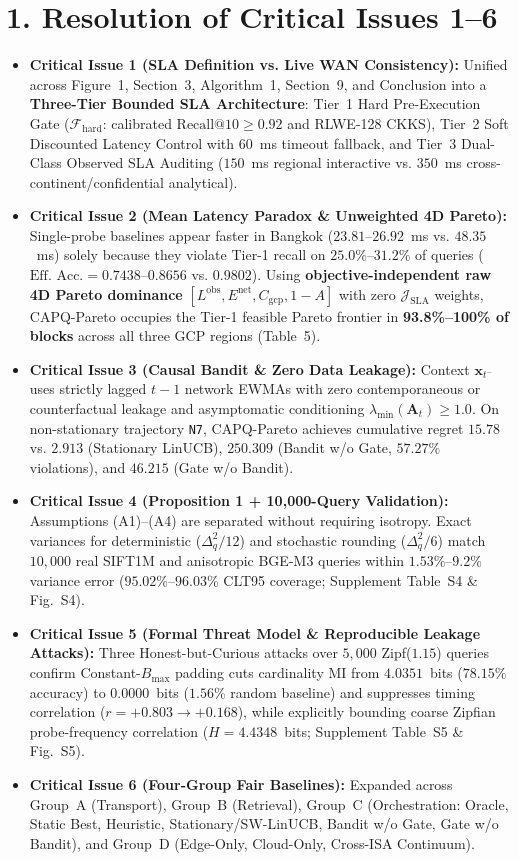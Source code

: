 \documentclass[11pt,a4paper]{article}
\begin{document}
\section*{1. Resolution of Critical Issues 1--6}
\begin{itemize}
    \item \textbf{Critical Issue 1 (SLA Definition vs. Live WAN Consistency):} Unified across Figure~1, Section~3, Algorithm~1, Section~9, and Conclusion into a \textbf{Three-Tier Bounded SLA Architecture}: Tier~1 Hard Pre-Execution Gate ($\mathcal{F}_{\mathrm{hard}}$: calibrated $\text{Recall@10}\ge 0.92$ and RLWE-128 CKKS), Tier~2 Soft Discounted Latency Control with $60$~ms timeout fallback, and Tier~3 Dual-Class Observed SLA Auditing ($150$~ms regional interactive vs. $350$~ms cross-continent/confidential analytical).
    \item \textbf{Critical Issue 2 (Mean Latency Paradox \& Unweighted 4D Pareto):} Single-probe baselines appear faster in Bangkok ($23.81$--$26.92$~ms vs. $48.35$~ms) solely because they violate Tier-1 recall on $25.0\%$--$31.2\%$ of queries ($\text{Eff. Acc.}=0.7438$--$0.8656$ vs. $0.9802$). Using \textbf{objective-independent raw 4D Pareto dominance} $[L^{\mathrm{obs}}, E^{\mathrm{net}}, C_{\mathrm{gcp}}, 1-A]$ with zero $\mathcal{J}_{\mathrm{SLA}}$ weights, CAPQ-Pareto occupies the Tier-1 feasible Pareto frontier in \textbf{93.8\%--100\% of blocks} across all three GCP regions (Table~5).
    \item \textbf{Critical Issue 3 (Causal Bandit \& Zero Data Leakage):} Context $\mathbf{x}_{t^-}$ uses strictly lagged $t-1$ network EWMAs with zero contemporaneous or counterfactual leakage and asymptomatic conditioning $\lambda_{\min}(\mathbf{A}_t)\ge 1.0$. On non-stationary trajectory \texttt{N7}, CAPQ-Pareto achieves cumulative regret $15.78$ vs. $2.913$ (Stationary LinUCB), $250.309$ (Bandit w/o Gate, $57.27\%$ violations), and $46.215$ (Gate w/o Bandit).
    \item \textbf{Critical Issue 4 (Proposition 1 + 10,000-Query Validation):} Assumptions (A1)--(A4) are separated without requiring isotropy. Exact variances for deterministic ($\Delta_q^2/12$) and stochastic rounding ($\Delta_q^2/6$) match $10,000$ real SIFT1M and anisotropic BGE-M3 queries within $1.53\%$--$9.2\%$ variance error ($95.02\%$--$96.03\%$ CLT95 coverage; Supplement Table~S4 \& Fig.~S4).
    \item \textbf{Critical Issue 5 (Formal Threat Model \& Reproducible Leakage Attacks):} Three Honest-but-Curious attacks over $5,000$ Zipf($1.15$) queries confirm Constant-$B_{\max}$ padding cuts cardinality MI from $4.0351$~bits ($78.15\%$ accuracy) to $0.0000$~bits ($1.56\%$ random baseline) and suppresses timing correlation ($r=+0.803 \to +0.168$), while explicitly bounding coarse Zipfian probe-frequency correlation ($H=4.4348$~bits; Supplement Table~S5 \& Fig.~S5).
    \item \textbf{Critical Issue 6 (Four-Group Fair Baselines):} Expanded across Group~A (Transport), Group~B (Retrieval), Group~C (Orchestration: Oracle, Static Best, Heuristic, Stationary/SW-LinUCB, Bandit w/o Gate, Gate w/o Bandit), and Group~D (Edge-Only, Cloud-Only, Cross-ISA Continuum).
\end{itemize}
\end{document}
